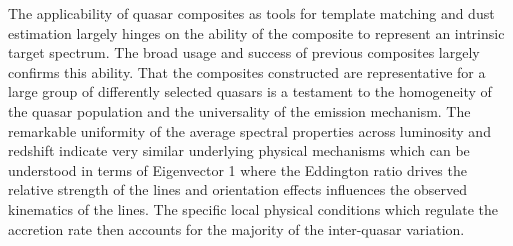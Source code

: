 \documentclass{aa}    %
\newcommand{\todo}[3]{{\color{#2}\emph{#1}: #3}}
\newcommand{\jstodo}[1]{\todo{ \\TODO }{green}{#1}}
\newcommand{\qtodo}[1]{\todo{\\ Question}{red}{#1}}
\begin{document}
The applicability of quasar composites as tools for template matching and dust estimation largely hinges on the ability of the composite to represent an intrinsic target spectrum. The broad usage and success of previous composites largely confirms this ability. That the composites constructed are representative for a large group of differently selected quasars is a testament to the homogeneity of the quasar population and the universality of the emission mechanism.
The remarkable uniformity of the average spectral properties across luminosity and redshift indicate very similar underlying physical mechanisms which can be understood in terms of Eigenvector 1 \citep{Boroson1992, Francis1992} where the Eddington ratio drives the relative strength of the lines and orientation effects influences the observed kinematics of the lines\citep{Shen2014a}. The specific local physical conditions which regulate the accretion rate then accounts for the majority of the inter-quasar variation.






%
%

\end{document}
